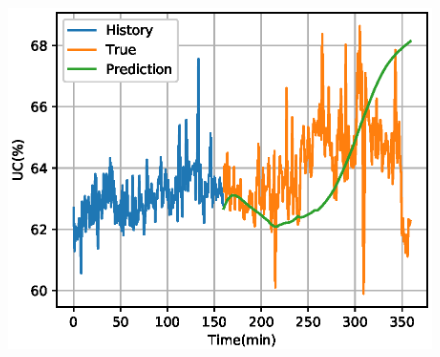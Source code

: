 \begin{figure}[t]
{\begin{minipage}[t]{0.33\linewidth}
\includegraphics[width=\linewidth,trim=12 0 0 20,clip]{figures/chapter3/predict_cmp/UC_MLP_nonsta_rk4_200.eps}
\end{minipage}
\label{fig:subfig_200_nonsta_rk4}
}%
\hspace{-22pt}
\end{figure}
